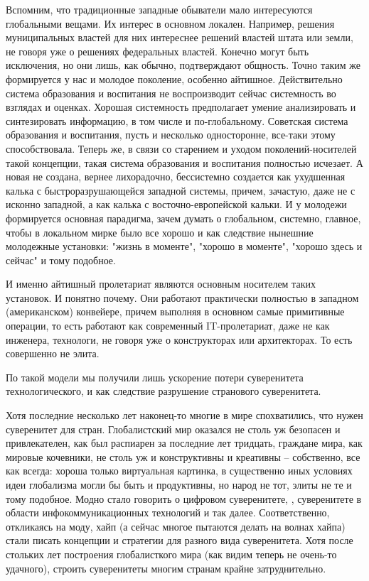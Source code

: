 \begin{partbacktext}
Вспомним, что традиционные западные обыватели мало интересуются глобальными вещами. Их интерес в основном локален. Например, решения муниципальных властей для них интереснее решений властей штата или земли, не говоря уже о решениях федеральных властей. Конечно могут быть исключения, но они лишь, как обычно, подтверждают общность. Точно таким же формируется у нас и молодое поколение, особенно айтишное. Действительно система образования и воспитания не воспроизводит сейчас системность во взглядах и оценках. Хорошая системность предполагает умение анализировать и синтезировать информацию, в том числе и по-глобальному. Советская система образования и воспитания, пусть и несколько односторонне, все-таки этому способствовала. Теперь же, в связи со старением и уходом поколений-носителей такой концепции, такая система образования и воспитания полностью исчезает. А новая не создана, вернее лихорадочно, бессистемно создается как ухудшенная калька с быстроразрушающейся западной системы, причем, зачастую, даже не с исконно западной, а как калька с восточно-европейской кальки. И у молодежи формируется основная парадигма, зачем думать о глобальном, системно, главное, чтобы в локальном мирке было все хорошо и как следствие нынешние молодежные установки: "жизнь в моменте"{}, "хорошо в моменте"{}, "хорошо здесь и сейчас"{} и тому подобное.

И именно айтишный пролетариат являются основным носителем таких установок. И понятно почему. Они работают практически полностью в западном (американском) конвейере, причем выполняя в основном самые примитивные операции, то есть работают как современный IT-пролетариат, даже не как инженера, технологи, не говоря уже о конструкторах или архитекторах. То есть совершенно не элита.

По такой модели мы получили лишь ускорение потери суверенитета технологического, и как следствие разрушение странового суверенитета.

Хотя последние несколько лет наконец-то многие в мире спохватились, что нужен суверенитет для стран. Глобалистский мир оказался не столь уж безопасен и привлекателен, как был распиарен за последние лет тридцать, граждане мира, как мировые кочевники, не столь уж и конструктивны и креативны -- собственно, все как всегда: хороша только виртуальная картинка, в существенно иных условиях идеи глобализма могли бы быть и продуктивны, но народ не тот, элиты не те и тому подобное. Модно стало говорить о цифровом суверенитете, , суверенитете в области инфокоммуникационных технологий и так далее. Соответственно, откликаясь на моду, хайп (а сейчас многое пытаются делать на волнах хайпа) стали писать концепции и стратегии для разного вида суверенитета. Хотя после стольких лет построения глобалисткого мира (как видим теперь не очень-то удачного), строить суверенитеты многим странам крайне затруднительно.


\end{partbacktext}
